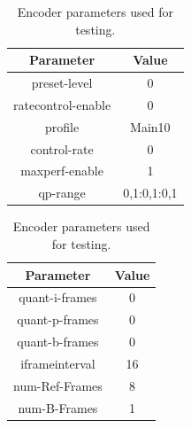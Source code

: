 \begin{table}[H]
    \begin{minipage}[b]{.5\linewidth}
        \centering
        \small
        \begin{tabular}{|c|c|}
            \hline
            \textbf{Parameter} & \textbf{Value} \\
            \hline
            preset-level       & 0              \\
            ratecontrol-enable & 0              \\
            profile            & Main10         \\
            control-rate       & 0              \\
            maxperf-enable     & 1              \\
            qp-range           & 0,1:0,1:0,1    \\
            \hline
        \end{tabular}
    \end{minipage}
    \begin{minipage}[b]{.5\linewidth}
        \centering
        \small
        \begin{tabular}{|c|c|}
            \hline
            \textbf{Parameter} & \textbf{Value} \\
            \hline
            quant-i-frames     & 0              \\
            quant-p-frames     & 0              \\
            quant-b-frames     & 0              \\
            iframeinterval     & 16             \\
            num-Ref-Frames     & 8              \\
            num-B-Frames       & 1              \\
            \hline
        \end{tabular}
    \end{minipage}
    \caption{Encoder parameters used for testing.}
    \label{tab:encoder_parameters}
\end{table}